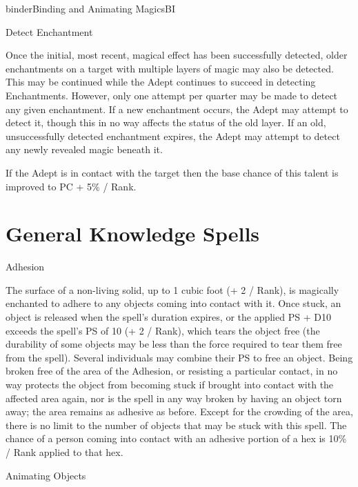 \begin{College}[1.2]{binder}{Binding and Animating Magics}{BI}
\begin{talent}[T-2]{Detect Enchantment}
\begin{effects}
Once the initial, most recent, magical effect has been successfully
detected, older enchantments on a target with multiple layers of magic
may also be detected.  This may be continued while the Adept continues
to succeed in detecting Enchantments.  However, only one attempt per
quarter may be made to detect any given enchantment.  If a new
enchantment occurs, the Adept may attempt to detect it, though this in
no way affects the status of the old layer.  If an old, unsuccessfully
detected enchantment expires, the Adept may attempt to detect any
newly revealed magic beneath it.

If the Adept is in contact with the target then the base chance of
this talent is improved to PC + 5\% / Rank.
\end{effects}
\end{talent}

\section{General Knowledge Spells}

\begin{spell}[G-1]{Adhesion}

\begin{effects}
The surface of a non-living solid, up to 1 cubic foot (+ 2 / Rank), is
magically enchanted to adhere to any objects coming into contact with
it.  Once stuck, an object is released when the spell’s duration
expires, or the applied PS + D10 exceeds the spell’s PS of 10 (+ 2 /
Rank), which tears the object free (the durability of some objects may
be less than the force required to tear them free from the spell).
Several individuals may combine their PS to free an object. Being
broken free of the area of the Adhesion, or resisting a particular
contact, in no way protects the object from becoming stuck if brought
into contact with the affected area again, nor is the spell in any way
broken by having an object torn away; the area remains as adhesive as
before. Except for the crowding of the area, there is no limit to the
number of objects that may be stuck with this spell. The chance of a
person coming into contact with an adhesive portion of a hex is 10\% /
Rank applied to that hex.
\end{effects}
\end{spell}

\begin{spell}[G-2]{Animating Objects}


\end{spell}
\end{College}
